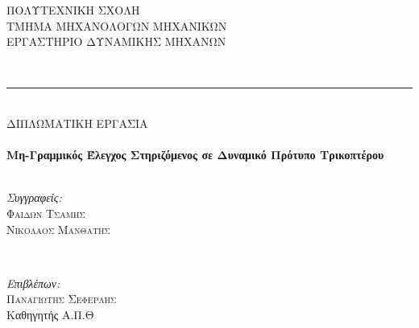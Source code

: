 \begin{titlepage}
\begin{minipage}{0.84\textwidth}
\begin{center}
        \textsc{\Large ΠΟΛΥΤΕΧΝΙΚΗ ΣΧΟΛΗ}\\[0.1cm]
        \textsc{\Large ΤΜΗΜΑ ΜΗΧΑΝΟΛΟΓΩΝ ΜΗΧΑΝΙΚΩΝ}\\[0.1cm]
        \textsc{\large ΕΡΓΑΣΤΗΡΙΟ ΔΥΝΑΜΙΚΗΣ ΜΗΧΑΝΩΝ}%
    \end{center}
    \end{minipage}\\[0.2cm]
    \rule{\linewidth}{0.3mm}\\[2.4cm]
\textsc{\Large ΔΙΠΛΩΜΑΤΙΚΗ ΕΡΓΑΣΙΑ}\\[0.5cm] %

\HRule \\[0.4cm]
{ \huge \bfseries Μη-Γραμμικός Έλεγχος Στηριζόμενος σε Δυναμικό Πρότυπο 
Τρικοπτέρου}\\[0.36cm] %
\HRule \\[1.5cm]

\begin{minipage}{0.4\textwidth}
\begin{flushleft} \large
\emph{Συγγραφείς:}\\
\textsc{Φαιδων Τσαμης}\\
\textsc{Νικολαος Μανθατης}
\end{flushleft}
\end{minipage}
~
\begin{minipage}{0.4\textwidth}
\begin{flushright} \large
\emph{Επιβλέπων:} \\
\textsc{Παναγιωτης Σεφερλης} \\
Καθηγητής \textsc{Α.Π.Θ}
\end{flushright}
\end{minipage}\\[1.5cm]



\end{titlepage}
